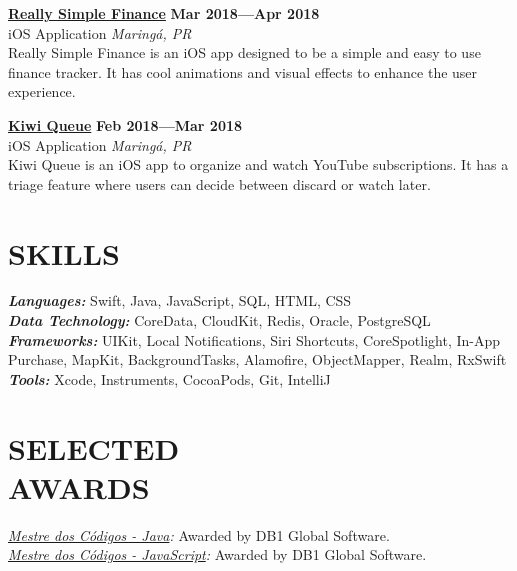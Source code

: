 \documentclass[line,margin]{res}
\begin{document}
\begin{resume}
  {\bf \href{https://itunes.apple.com/us/app/really-simple-finance/id1370859710}{Really Simple Finance}} \hfill {\bf Mar 2018---Apr 2018} \\
  iOS Application \hfill {\sl Maring\'a, PR}\\[6pt]
  Really Simple Finance is an iOS app designed to be a simple and easy to use finance tracker.
  It has cool animations and visual effects to enhance the user experience.

  {\bf \href{https://itunes.apple.com/us/app/kiwi-queue/id1352747116}{Kiwi Queue}} \hfill {\bf Feb 2018---Mar 2018} \\
  iOS Application \hfill {\sl Maring\'a, PR}\\[6pt]
  Kiwi Queue is an iOS app to organize and watch YouTube subscriptions.
  It has a triage feature where users can decide between discard or watch later.


\section{SKILLS}
  {\sl {\bf Languages:}} Swift, Java, JavaScript, SQL, HTML, CSS \\
  {\sl {\bf Data Technology:}} CoreData, CloudKit, Redis, Oracle, PostgreSQL \\
  {\sl {\bf Frameworks:}} UIKit, Local Notifications, Siri Shortcuts, CoreSpotlight, In-App Purchase, MapKit, BackgroundTasks, Alamofire, ObjectMapper, Realm, RxSwift \\
  {\sl {\bf Tools:}} Xcode, Instruments, CocoaPods, Git, IntelliJ


\section{SELECTED \\ AWARDS}             
  {\sl \href{https://mestredoscodigos.com.br/primeira-entrega-dos-pins-do-mestre-dos-codigos}{Mestre dos C\'odigos - Java}:} Awarded by DB1 Global Software.\\
  {\sl \href{https://mestredoscodigos.com.br/primeira-entrega-dos-pins-do-mestre-dos-codigos}{Mestre dos C\'odigos - JavaScript}:} Awarded by DB1 Global Software.\\
 

\end{resume}
\end{document}
